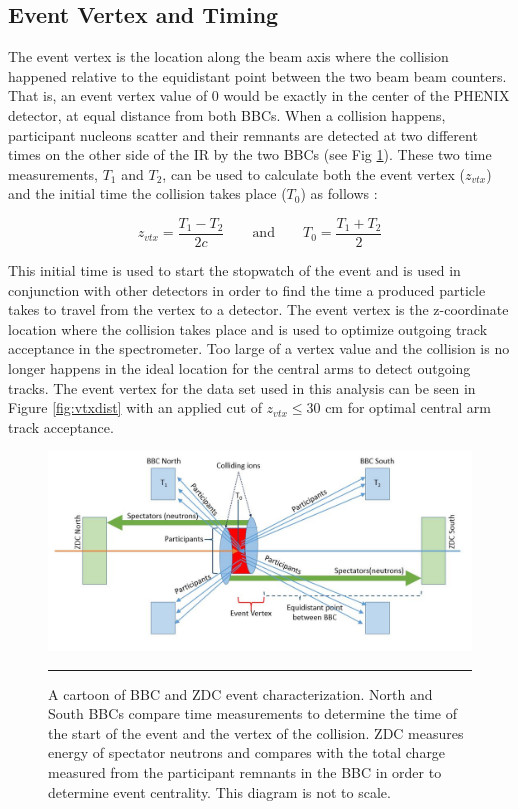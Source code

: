 \subsection{Event Vertex and Timing}
\label{sect:timeandvtx}
The event vertex is the location along the beam axis where the collision happened relative to the equidistant point between the two beam beam counters. That is, an event vertex value of 0 would be exactly in the center of the PHENIX detector, at equal distance from both BBCs. When a collision happens, participant nucleons scatter and their remnants are detected at two different times on the other side of the IR by the two BBCs (see Fig \ref{fig:zdcvtx}). These two time measurements, $T_1$ and $T_2$, can be used to calculate both the event vertex ($z_{vtx}$) and the initial time the collision takes place ($T_0$) as follows \citep{Mitchell:2002wu}:

\begin{equation}
 z_{vtx} = \frac{T_1 - T_2}{2c} \qquad\text{and}\qquad T_0 = \frac{T_1 + T_2}{2}
\end{equation}

This initial time is used to start the stopwatch of the event and is used in conjunction with other detectors in order to find the time a produced particle takes to travel from the vertex to a detector. The event vertex is the z-coordinate location where the collision takes place and is used to optimize outgoing track acceptance in the spectrometer. Too large of a vertex value and the collision is no longer happens in the ideal location for the central arms to detect outgoing tracks. The event vertex for the data set used in this analysis can be seen in Figure \ref{fig:vtxdist} with an applied cut of $z_{vtx} \leq 30$ cm for optimal central arm track acceptance.

\begin{figure}[htbp!]
  \centering
    \includegraphics[width=1\textwidth]{Figures/BBCevtchar.JPG}
    \rule{35em}{0.5pt}
  \caption[Diagram of BBC and ZDC event characterization]{A cartoon of BBC and ZDC event characterization. North and South BBCs compare time measurements to determine the time of the start of the event and the vertex of the collision. ZDC measures energy of spectator neutrons and compares with the total charge measured from the participant remnants in the BBC in order to determine event centrality. This diagram is not to scale.}
  \label{fig:zdcvtx}
\end{figure}


